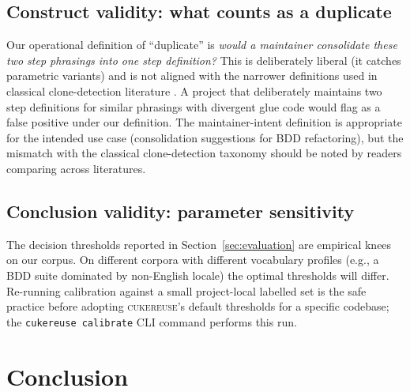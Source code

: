 \documentclass[11pt,a4paper]{article}
\newcommand{\tool}{\textsc{cukereuse}\xspace}
\begin{document}
\subsection{Construct validity: what counts as a duplicate}

Our operational definition of ``duplicate'' is \emph{would a
maintainer consolidate these two step phrasings into one step
definition?} This is deliberately liberal (it catches parametric
variants) and is not aligned with the narrower definitions used in
classical clone-detection literature
\citep{roy2007survey,bellon2007comparison}. A project that
deliberately maintains two step definitions for similar phrasings
with divergent glue code would flag as a false positive under our
definition. The maintainer-intent definition is appropriate for the
intended use case (consolidation suggestions for BDD refactoring),
but the mismatch with the classical clone-detection taxonomy should
be noted by readers comparing across literatures.

\subsection{Conclusion validity: parameter sensitivity}

The decision thresholds reported in Section~\ref{sec:evaluation} are
empirical knees on our corpus. On different corpora with different
vocabulary profiles (e.g., a BDD suite dominated by non-English
locale) the optimal thresholds will differ. Re-running calibration
against a small project-local labelled set is the safe practice
before adopting \tool's default thresholds for a specific codebase;
the \texttt{cukereuse calibrate} CLI command performs this run.

\section{Conclusion}
\label{sec:conclusion}
\end{document}
